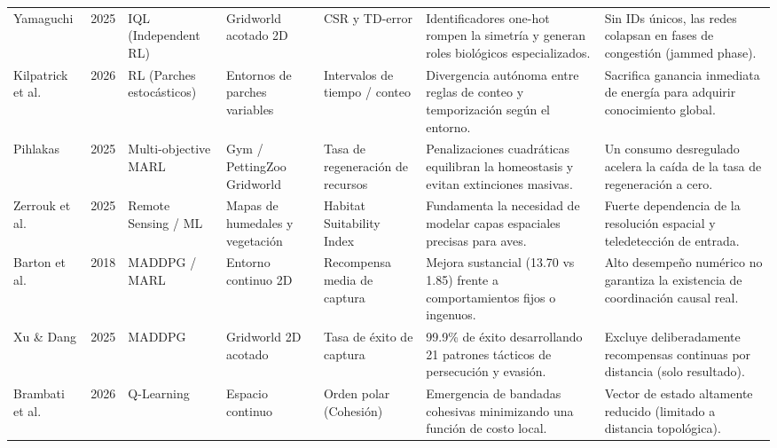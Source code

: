 \documentclass[conference]{IEEEtran}
\begin{document}
\begin{table}[tbp]
\begin{tabular}{p{1.6cm} c p{2.0cm} p{2.0cm} p{2.2cm} p{3.5cm} p{3.4cm}}
\addlinespace

Yamaguchi \cite{Paper12} &
2025 &
IQL (Independent RL) &
Gridworld acotado 2D &
CSR y TD-error &
Identificadores one-hot rompen la simetría y generan roles biológicos especializados. &
Sin IDs únicos, las redes colapsan en fases de congestión (jammed phase). \\

\addlinespace

Kilpatrick et al. \cite{Paper13} &
2026 &
RL (Parches estocásticos) &
Entornos de parches variables &
Intervalos de tiempo / conteo &
Divergencia autónoma entre reglas de conteo y temporización según el entorno. &
Sacrifica ganancia inmediata de energía para adquirir conocimiento global. \\

\addlinespace

Pihlakas \cite{Paper14} &
2025 &
Multi-objective MARL &
Gym / PettingZoo Gridworld &
Tasa de regeneración de recursos &
Penalizaciones cuadráticas equilibran la homeostasis y evitan extinciones masivas. &
Un consumo desregulado acelera la caída de la tasa de regeneración a cero. \\

\addlinespace

Zerrouk et al. \cite{Survey2} &
2025 &
Remote Sensing / ML &
Mapas de humedales y vegetación &
Habitat Suitability Index &
Fundamenta la necesidad de modelar capas espaciales precisas para aves. &
Fuerte dependencia de la resolución espacial y teledetección de entrada. \\

\addlinespace

Barton et al. \cite{Paper15} &
2018 &
MADDPG / MARL &
Entorno continuo 2D &
Recompensa media de captura &
Mejora sustancial (13.70 vs 1.85) frente a comportamientos fijos o ingenuos. &
Alto desempeño numérico no garantiza la existencia de coordinación causal real. \\

\addlinespace

Xu \& Dang \cite{Paper16} &
2025 &
MADDPG &
Gridworld 2D acotado &
Tasa de éxito de captura &
99.9\% de éxito desarrollando 21 patrones tácticos de persecución y evasión. &
Excluye deliberadamente recompensas continuas por distancia (solo resultado). \\

\addlinespace

Brambati et al. \cite{Paper17} &
2026 &
Q-Learning &
Espacio continuo &
Orden polar (Cohesión) &
Emergencia de bandadas cohesivas minimizando una función de costo local. &
Vector de estado altamente reducido (limitado a distancia topológica). \\


\end{tabular}
\end{table}
\end{document}
